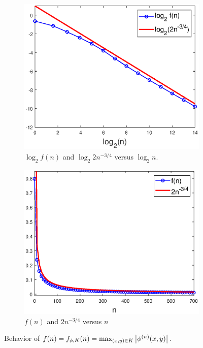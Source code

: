 \documentclass[11pt]{article}
\newenvironment{example}
  {\pushQED{\qed}\renewcommand{\qedsymbol}{$\triangle$}\examplex}
  {\popQED\endexamplex}
\theoremstyle{remark}
\begin{document}
\begin{example}
\begin{figure}[!htb]
    \begin{subfigure}{0.49\textwidth}
    \centering
    \includegraphics[scale=0.58]{Fig7a.eps}
    \caption{$\log_2 f(n)$ and  $\log_2 2n^{-3/4}$ versus $\log_2 n$.}
    \end{subfigure}
    \begin{subfigure}{0.49\textwidth}
    \centering
    \includegraphics[scale=0.58]{Fig7b.eps}
    \caption{$f(n)$ and $2n^{-3/4}$ versus $n$}
    \end{subfigure}
    \caption{Behavior of $f(n)=f_{\phi,K}(n)=\max_{(x,y)\in K}\abs{\phi^{(n)}(x,y)}$.}
    \label{fig:Conv_Pwr_2}
\end{figure}


\end{example}
\end{document}
